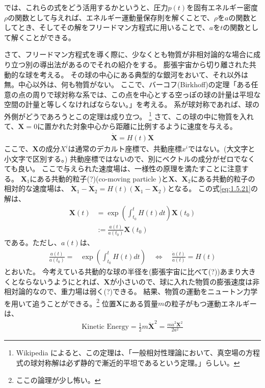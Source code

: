 \documentclass[11pt]{ltjsarticle}
\theoremstyle{plain}
\theoremstyle{break}
\begin{document}
では、これらの式をどう活用するかというと、圧力$p(t)$を固有エネルギー密度$\rho$の関数として与えれば、エネルギー運動量保存則を解くことで、$\rho$を$a$の関数としてとき、そしてその解をフリードマン方程式に用いることで、$a$を$t$の関数として解くことができる。

さて、フリードマン方程式を導く際に、少なくとも物質が非相対論的な場合に成り立つ別の導出法があるのでそれの紹介をする。
膨張宇宙から切り離された共動的な球を考える。
その球の中心にある典型的な銀河をおいて、それ以外は無。中心以外は、何も物質がない。
ここで、バーコフ(Birkhoff)の定理「ある任意の点の周りで球対称な系では、この点を中心とする空っぽの球の計量は平坦な空間の計量と等しくなければならない。」を考える。
系が球対称であれば、球の外側がどうであろうとこの定理は成り立つ。
\footnote{
Wikipedia によると、この定理は、「一般相対性理論において、真空場の方程式の球対称解は必ず静的で漸近的平坦であるという定理。」らしい。
}%
さて、この球の中に物質を入れて、$\mathbf{X} = 0$に置かれた対象中心から距離に比例するように速度を与える。
\begin{align}
  \dot{\mathbf{X}} = H(t) \mathbf{X} \label{eq:1.5.21}
\end{align}%
ここで、$\mathbf{X}$の成分$X^i$は通常のデカルト座標で、共動座標$x^i$ではない。(大文字と小文字で区別する。)
共動座標ではないので、別にベクトルの成分がゼロでなくても良い。
ここで与えられた速度場は、一様性の原理を満たすことに注意する。
$\mathbf{X}_1$にある共動的粒子(?)(co-moving particle )と$\mathbf{X}$、$\mathbf{X}_2$にある共動的粒子の相対的な速度場は、
$\dot{\mathbf{X}}_{1}-\dot{\mathbf{X}}_{2}=H(t)\left(\mathbf{X}_{1}-\mathbf{X}_{2}\right)$となる。
この式\eqref{eq:1.5.21}の解は、
\begin{align}
  \mathbf{X}(t)
  	&= \exp(\int_{t_0}^{t} H(t) dt ) \mathbf{X}(t_0)\\
	& := \frac{a(t)}{a(t_0)}  \mathbf{X}(t_0)
\end{align}%
である。ただし、$a(t)$は、
\begin{align}
  \frac{a(t)}{a(t_0)} =& \exp(\int_{t_0}^{t} H(t) dt)  \quad \Longleftrightarrow \quad \frac{\dot{a}(t)}{a(t)} = H(t)
\end{align}%
とおいた。
今考えている共動的な球の半径を(膨張宇宙に比べて(?))あまり大きくとならないうようにとれば、$\mathbf{X}$が小さいので、球に入れた物質の膨張速度は非相対論的なので、重力場は弱く(?)できる。
結果、物質の運動をニュートン力学を用いて追うことができる。\footnote{ここの論理が少し怖い。}
位置$\mathbf{X}$にある質量$m$の粒子がもつ運動エネルギーは、
\begin{align}
\mathrm{Kinetic\,\,Energy} = \frac{1}{2} m \dot{\mathbf{X}}^{2}=\frac{m \dot{a}^{2} \mathbf{X}^{2}}{2 a^{2}}
\end{align}%
\end{document}

